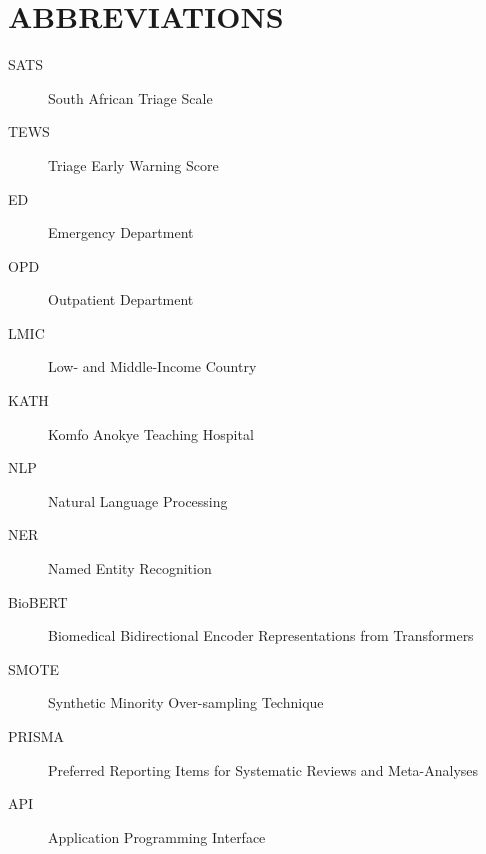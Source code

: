 \chapter*{ABBREVIATIONS}

\begin{description}
\item[SATS] South African Triage Scale
\item[TEWS] Triage Early Warning Score
\item[ED] Emergency Department
\item[OPD] Outpatient Department
\item[LMIC] Low- and Middle-Income Country
\item[KATH] Komfo Anokye Teaching Hospital
\item[NLP] Natural Language Processing
\item[NER] Named Entity Recognition
\item[BioBERT] Biomedical Bidirectional Encoder Representations from Transformers
\item[SMOTE] Synthetic Minority Over-sampling Technique
\item[PRISMA] Preferred Reporting Items for Systematic Reviews and Meta-Analyses
\item[API] Application Programming Interface
\end{description}
